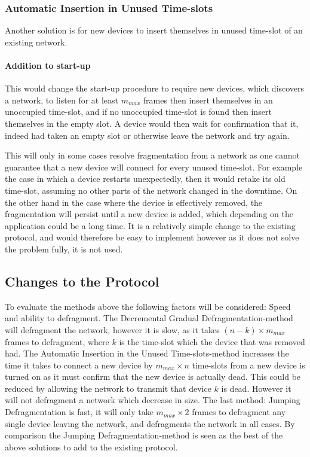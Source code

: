 \subsubsection{Automatic Insertion in Unused Time-slots}
Another solution is for new devices to insert themselves in unused time-slot of an existing network.

\paragraph{Addition to start-up}
This would change the start-up procedure to require new devices, which discovers a network, to listen for at least $m_{max}$ frames then insert themselves in an unoccupied time-slot, and if no unoccupied time-slot is found then insert themselves in the empty slot.
A device would then wait for confirmation that it, indeed had taken an empty slot or otherwise leave the network and try again.


\bigskip \noindent
This will only in some cases resolve fragmentation from a network as one cannot guarantee that a new device will connect for every unused time-slot. 
For example the case in which a device restarts unexpectedly, then it would retake its old time-slot, assuming no other parts of the network changed in the downtime.
On the other hand in the case where the device is effectively removed, the fragmentation will persist until a new device is added, which depending on the application could be a long time.
It is a relatively simple change to the existing protocol, and would therefore be easy to implement however as it does not solve the problem fully, it is not used. 

\subsection{Changes to the Protocol}
To evaluate the methods above the following factors will be considered: Speed and ability to defragment.
The Decremental Gradual Defragmentation-method will defragment the network, however it is slow, as it takes $(n - k) \times m_{max}$ frames to defragment, where $k$ is the time-slot which the device  that was removed had. 
The Automatic Insertion in the Unused Time-slots-method increases the time it takes to connect a new device by $m_{max} \times n$ time-slots from a new device is turned on as it must confirm that the new device is actually dead.
This could be reduced by allowing the network to transmit that device $k$ is dead.
However it will not defragment a network which decrease in size. 
The last method: Jumping Defragmentation is fast, it will only take $m_{max} \times 2$ frames to defragment any single device leaving the network, and defragments the network in all cases. 
By comparison the Jumping Defragmentation-method is seen as the best of the above solutions to add to the existing protocol. 

